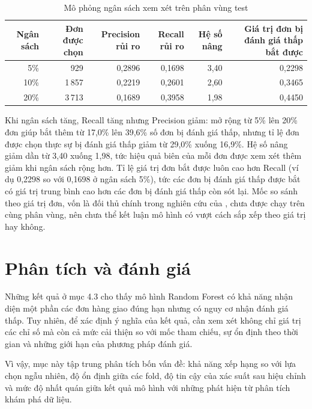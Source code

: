 \documentclass[12pt,a4paper]{report}
\begin{document}
\begin{table}[htbp]\centering\small
\caption{Mô phỏng ngân sách xem xét trên phân vùng test}\label{tab:res-budget}
\begin{tabular}{rrrrrr}
\toprule
Ngân sách & Đơn được chọn & Precision rủi ro & Recall rủi ro & Hệ số nâng & Giá trị đơn bị đánh giá thấp bắt được \\
\midrule
5\%  &    929 & 0,2896 & 0,1698 & 3,40 & 0,2298 \\
10\% &  1\,857 & 0,2219 & 0,2601 & 2,60 & 0,3465 \\
20\% &  3\,713 & 0,1689 & 0,3958 & 1,98 & 0,4450 \\
\bottomrule
\end{tabular}
\end{table}

Khi ngân sách tăng, Recall tăng nhưng Precision giảm: mở rộng từ 5\% lên 20\% đơn giúp bắt thêm từ 17,0\% lên 39,6\% số đơn bị đánh giá thấp, nhưng tỉ lệ đơn được chọn thực sự bị đánh giá thấp giảm từ 29,0\% xuống 16,9\%. Hệ số nâng giảm dần từ 3,40 xuống 1,98, tức hiệu quả biên của mỗi đơn được xem xét thêm giảm khi ngân sách rộng hơn. Tỉ lệ giá trị đơn bắt được luôn cao hơn Recall (ví dụ 0,2298 so với 0,1698 ở ngân sách 5\%), tức các đơn bị đánh giá thấp được bắt có giá trị trung bình cao hơn các đơn bị đánh giá thấp còn sót lại. Mốc so sánh theo giá trị đơn, vốn là đối thủ chính trong nghiên cứu của \textcite{li2026valuesorting}, chưa được chạy trên cùng phân vùng, nên chưa thể kết luận mô hình có vượt cách sắp xếp theo giá trị hay không.

\section{Phân tích và đánh giá}\label{sec:results-analysis}

Những kết quả ở mục 4.3 cho thấy mô hình Random Forest có khả năng nhận diện một phần các đơn hàng giao đúng hạn nhưng có nguy cơ nhận đánh giá thấp. Tuy nhiên, để xác định ý nghĩa của kết quả, cần xem xét không chỉ giá trị các chỉ số mà còn cả mức cải thiện so với mốc tham chiếu, sự ổn định theo thời gian và những giới hạn của phương pháp đánh giá.

Vì vậy, mục này tập trung phân tích bốn vấn đề: khả năng xếp hạng so với lựa chọn ngẫu nhiên, độ ổn định giữa các fold, độ tin cậy của xác suất sau hiệu chỉnh và mức độ nhất quán giữa kết quả mô hình với những phát hiện từ phân tích khám phá dữ liệu.
\end{document}
